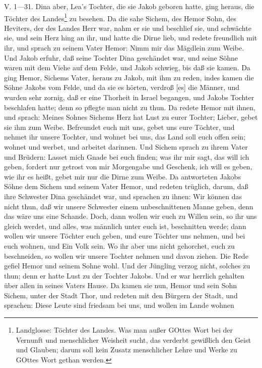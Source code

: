 \begin{schriftzitat}
V. 1—31. Dina aber, Lea’s Tochter, die sie Jakob geboren hatte, ging heraus, die Töchter des Landes\footnote{Landglosse: Töchter des Landes. Was man außer GOttes Wort bei der Vernunft und menschlicher Weisheit sucht, das verderbt gewißlich den Geist und Glauben; darum soll kein Zusatz menschlicher Lehre und Werke zu GOttes Wort gethan werden.} zu besehen. Da die sahe Sichem, des Hemor Sohn, des Heviters, der des Landes Herr war, nahm er sie und beschlief sie, und schwächte sie, und sein Herz hing an ihr, und hatte die Dirne lieb, und redete freundlich mit ihr, und sprach zu seinem Vater Hemor: Nimm mir das Mägdlein zum Weibe. Und Jakob erfuhr, daß seine Tochter Dina geschändet war, und seine Söhne waren mit dem Viehe auf dem Felde, und Jakob schwieg, bis daß sie kamen. Da ging Hemor, Sichems Vater, heraus zu Jakob, mit ihm zu reden, indes kamen die Söhne Jakobs vom Felde, und da sie es hörten, verdroß [es] die Männer, und wurden sehr zornig, daß er eine Thorheit in Israel begangen, und Jakobs Tochter beschlafen hatte; denn so pflegte man nicht zu thun. Da redete Hemor mit ihnen, und sprach: Meines Sohnes Sichems Herz hat Lust zu eurer Tochter; Lieber, gebet sie ihm zum Weibe. Befreundet euch mit uns, gebet uns eure Töchter, und nehmet ihr unsere Tochter, und wohnet bei uns, das Land soll euch offen sein; wohnet und werbet, und arbeitet darinnen. Und Sichem sprach zu ihrem Vater und Brüdern: Lasset mich Gnade bei euch finden; was ihr mir sagt, das will ich geben, fordert nur getrost von mir Morgengabe und Geschenk, ich will es geben, wie ihr es heißt, gebet mir nur die Dirne zum Weibe. Da antworteten Jakobs Söhne dem Sichem und seinem Vater Hemor, und redeten trüglich, darum, daß ihre Schwester Dina geschändet war, und sprachen zu ihnen: Wir können das nicht thun, daß wir unsere Schwester einem unbeschnittenen Manne geben, denn das wäre uns eine Schande. Doch, dann wollen wir euch zu Willen sein, so ihr uns gleich werdet, und alles, was männlich unter euch ist, beschnitten werde; dann wollen wir unsere Töchter euch geben, und eure Töchter uns nehmen, und bei euch wohnen, und Ein Volk sein. Wo ihr aber uns nicht gehorchet, euch zu beschneiden, so wollen wir unsere Tochter nehmen und davon ziehen. Die Rede gefiel Hemor und seinem Sohne wohl. Und der Jüngling verzog nicht, solches zu thun; denn er hatte Lust zu der Tochter Jakobs. Und er war herrlich gehalten über allen in seines Vaters Hause. Da kamen sie nun, Hemor und sein Sohn Sichem, unter der Stadt Thor, und redeten mit den Bürgern der Stadt, und sprachen: Diese Leute sind friedsam bei uns, und wollen im Lande wohnen

\end{schriftzitat}
